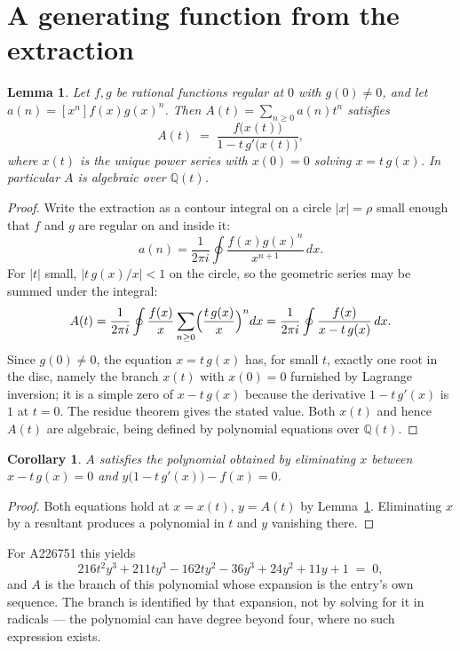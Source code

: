 \documentclass[11pt,a4paper]{article}
\theoremstyle{plain}
\newtheorem{lemma}[theorem]{Lemma}
\newtheorem{corollary}[theorem]{Corollary}
\theoremstyle{definition}
\begin{document}
\section{A generating function from the extraction}

\begin{lemma}\label{lem:diag}
Let $f,g$ be rational functions regular at $0$ with $g(0)\neq0$, and let
$a(n)=[x^{n}]f(x)g(x)^{n}$. Then $A(t)=\sum_{n\ge0}a(n)t^{n}$ satisfies
\[
A(t)\;=\;\frac{f\bigl(x(t)\bigr)}{1-t\,g'\bigl(x(t)\bigr)},
\]
where $x(t)$ is the unique power series with $x(0)=0$ solving $x=t\,g(x)$. In particular
$A$ is algebraic over $\mathbb{Q}(t)$.
\end{lemma}

\begin{proof}
Write the extraction as a contour integral on a circle $|x|=\rho$ small enough that $f$
and $g$ are regular on and inside it:
\[
a(n)=\frac{1}{2\pi i}\oint \frac{f(x)g(x)^{n}}{x^{n+1}}\,dx .
\]
For $|t|$ small, $|t\,g(x)/x|<1$ on the circle, so the geometric series may be summed
under the integral:
\[
A(t)=\frac{1}{2\pi i}\oint\frac{f(x)}{x}\sum_{n\ge0}\Bigl(\frac{t\,g(x)}{x}\Bigr)^{n}dx
     =\frac{1}{2\pi i}\oint\frac{f(x)}{x-t\,g(x)}\,dx .
\]
Since $g(0)\neq0$, the equation $x=t\,g(x)$ has, for small $t$, exactly one root in the
disc, namely the branch $x(t)$ with $x(0)=0$ furnished by Lagrange inversion; it is a
simple zero of $x-t\,g(x)$ because the derivative $1-t\,g'(x)$ is $1$ at $t=0$. The
residue theorem gives the stated value. Both $x(t)$ and hence $A(t)$ are algebraic,
being defined by polynomial equations over $\mathbb{Q}(t)$.
\end{proof}

\begin{corollary}\label{cor:minpoly}
$A$ satisfies the polynomial obtained by eliminating $x$ between
$x-t\,g(x)=0$ and $y\bigl(1-t\,g'(x)\bigr)-f(x)=0$.
\end{corollary}

\begin{proof}
Both equations hold at $x=x(t)$, $y=A(t)$ by Lemma~\ref{lem:diag}. Eliminating $x$ by a
resultant produces a polynomial in $t$ and $y$ vanishing there.
\end{proof}

For A226751 this yields
\[
216 t^{2} y^{3} + 211 t y^{3} - 162 t y^{2} - 36 y^{3} + 24 y^{2} + 11 y + 1 \;=\;0 ,
\]
and $A$ is the branch of this polynomial whose expansion is the entry's own sequence.
The branch is identified by that expansion, not by solving for it in radicals --- the
polynomial can have degree beyond four, where no such expression exists.
\end{document}
